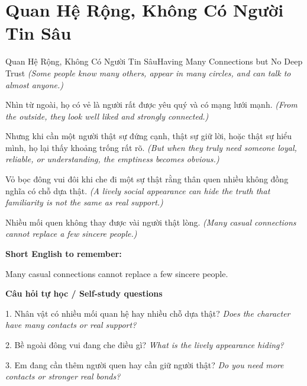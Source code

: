 \section{Quan Hệ Rộng, Không Có Người Tin Sâu}
\begin{truyen}{Quan Hệ Rộng, Không Có Người Tin Sâu}{Having Many Connections but No Deep Trust}
\textit{(Some people know many others, appear in many circles, and can talk to almost anyone.)}

Nhìn từ ngoài, họ có vẻ là người rất được yêu quý và có mạng lưới mạnh.
\textit{(From the outside, they look well liked and strongly connected.)}

Nhưng khi cần một người thật sự đứng cạnh, thật sự giữ lời, hoặc thật sự hiểu mình, họ lại thấy khoảng trống rất rõ.
\textit{(But when they truly need someone loyal, reliable, or understanding, the emptiness becomes obvious.)}

Vỏ bọc đông vui đôi khi che đi một sự thật rằng thân quen nhiều không đồng nghĩa có chỗ dựa thật.
\textit{(A lively social appearance can hide the truth that familiarity is not the same as real support.)}

\end{truyen}

\begin{baihoc}
Nhiều mối quen không thay được vài người thật lòng.
\textit{(Many casual connections cannot replace a few sincere people.)}
\end{baihoc}

\begin{ghinhoanh}
\textbf{Short English to remember:}

Many casual connections cannot replace a few sincere people.

\end{ghinhoanh}

\begin{tuhocnhanh}
\textbf{Câu hỏi tự học / Self-study questions}

1. Nhân vật có nhiều mối quan hệ hay nhiều chỗ dựa thật? \textit{Does the character have many contacts or real support?}

2. Bề ngoài đông vui đang che điều gì? \textit{What is the lively appearance hiding?}

3. Em đang cần thêm người quen hay cần giữ người thật? \textit{Do you need more contacts or stronger real bonds?}
\end{tuhocnhanh}
\ngancach

